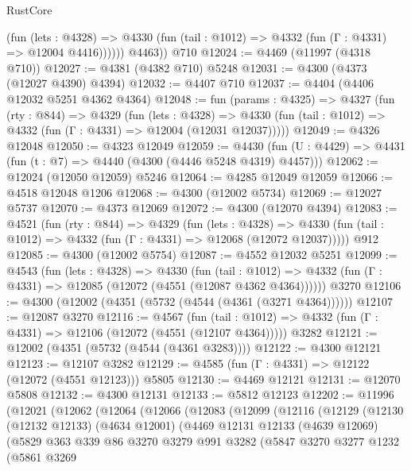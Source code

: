 \begin{lexlean}{RustCore}
\begin{coremodule}
              (fun (lets : @4328) =>
              @4330 (fun (tail : @1012) => @4332 (fun (Γ : @4331) => @12004 @4416))))))
        @4463))
    @710
@12024 := @4469 (@11997 (@4318 @710))
@12027 := @4381 (@4382 @710) @5248
@12031 := @4300 (@4373 (@12027 @4390) @4394)
@12032 := @4407 @710
@12037 := @4404 (@4406 @12032 @5251 @4362 @4364)
@12048 := fun (params : @4325) =>
  @4327
    (fun (rty : @844) =>
    @4329
      (fun (lets : @4328) =>
      @4330 (fun (tail : @1012) => @4332 (fun (Γ : @4331) => @12004 (@12031 @12037)))))
@12049 := @4326 @12048
@12050 := @4323 @12049
@12059 := @4430 (fun (U : @4429) => @4431 (fun (t : @7) => @4440 (@4300 (@4446 @5248 @4319) @4457)))
@12062 := @12024 (@12050 @12059) @5246
@12064 := @4285 @12049 @12059
@12066 := @4518 @12048 @1206
@12068 := @4300 (@12002 @5734)
@12069 := @12027 @5737
@12070 := @4373 @12069
@12072 := @4300 (@12070 @4394)
@12083 := @4521
    (fun (rty : @844) =>
    @4329
      (fun (lets : @4328) =>
      @4330 (fun (tail : @1012) => @4332 (fun (Γ : @4331) => @12068 (@12072 @12037)))))
    @912
@12085 := @4300 (@12002 @5754)
@12087 := @4552 @12032 @5251
@12099 := @4543
    (fun (lets : @4328) =>
    @4330
      (fun (tail : @1012) =>
      @4332 (fun (Γ : @4331) => @12085 (@12072 (@4551 (@12087 @4362 @4364))))))
    @3270
@12106 := @4300 (@12002 (@4351 (@5732 (@4544 (@4361 (@3271 @4364))))))
@12107 := @12087 @3270
@12116 := @4567
    (fun (tail : @1012) => @4332 (fun (Γ : @4331) => @12106 (@12072 (@4551 (@12107 @4364)))))
    @3282
@12121 := @12002 (@4351 (@5732 (@4544 (@4361 @3283))))
@12122 := @4300 @12121
@12123 := @12107 @3282
@12129 := @4585 (fun (Γ : @4331) => @12122 (@12072 (@4551 @12123))) @5805
@12130 := @4469 @12121
@12131 := @12070 @5808
@12132 := @4300 @12131
@12133 := @5812 @12123
@12202 := @11996
    (@12021
      (@12062
        (@12064
          (@12066
            (@12083
              (@12099
                (@12116
                  (@12129
                    (@12130
                      (@12132 @12133)
                      (@4634 @12001)
                      (@4469
                        @12131
                        @12133
                        (@4639 @12069)
                        (@5829
                          @363
                          @339
                          @86
                          @3270
                          @3279
                          @991
                          @3282
                          (@5847
                            @3270
                            @3277
                            @1232
                            (@5861
                              @3269

\end{coremodule}
\end{lexlean}
